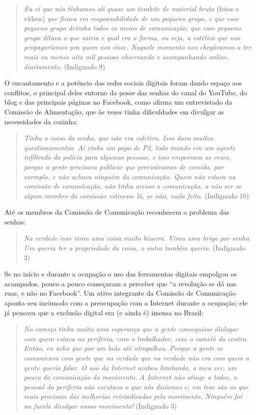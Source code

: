 \begin{quote}
\emph{Eu vi que nós tínhamos ali quase um terabite de material bruto}
(fotos e vídeos) \emph{que ficava em responsabilidade de um pequeno
grupo, e que esse pequeno grupo detinha todos os meios de comunicação,
que esse pequeno grupo ditava o que sairia e qual era a forma, ou seja,
a estética que nos propagaríamos pra quem nos visse. Naquele momento nos
chegávamos a ter mais ou menos oito mil pessoas observando e
acompanhando \emph{online}, diariamente.} (Indignado 9)
\end{quote}

O encantamento e a potência das redes sociais digitais foram dando
espaço aos conflitos, o principal deles entorno da posse das senhas do
canal do YouTube, do blog e das principais páginas no Facebook, como
afirma um entrevistado da Comissão de Alimentação, que às vezes tinha
dificuldades em divulgar as necessidades da cozinha:

\begin{quote}
\emph{Tinha a coisa da senha, que não era coletiva. Isso dava muitos
questionamentos. Ai vinha um papo de P2, todo mundo era um agente
infiltrado da polícia para algumas pessoas, e isso emperrava as vezes,
porque a gente precisava publicar que precisávamos de comida, por
exemplo, e não achava ninguém da comunicação. Quem não estava na
comissão de comunicação, não tinha acesso a comunicação, a não ser se
algum membro da comissão estivesse lá, se não, nada feito}. (Indignado
10)
\end{quote}

Até os membros da Comissão de Comunicação reconhecem o problema das
senhas:

\begin{quote}
\emph{Na verdade isso virou uma coisa muito bizarra. Virou uma briga por
senha. Um queria ter a propriedade da coisa, o outro também queria}.
(Indignado 3)
\end{quote}

Se no início e durante a ocupação o uso das ferramentas digitais
empolgou os acampados, pouco a pouco começaram a perceber que ``a
revolução se dá nas ruas, e não no Facebook''. Um ativo integrante da
Comissão de Comunicação aponta seu incômodo com a preocupação com a
Internet durante a ocupação; ele já pensava que a exclusão digital era
(e ainda é) imensa no Brasil:

\begin{quote}
\emph{No começo tinha muito uma esperança que a gente conseguisse
dialogar com quem estava na periferia, com o trabalhador, com o camelô
do centro. Então, eu acho que por um lado até atrapalhou. Porque a gente
se comunicava com gente que na verdade que na verdade não era com quem a
gente queria falar. O uso da Internet acabou limitando, a meu ver, um
pouco da comunicação do movimento. A Internet não atinge a todos, o
pessoal da periferia não escutava o que nós dizíamos e, em tese são os
que mais precisam das melhorias reivindicadas pelo movimento. Ninguém
foi na favela divulgar nosso movimento!} (Indignado 3)
\end{quote}

